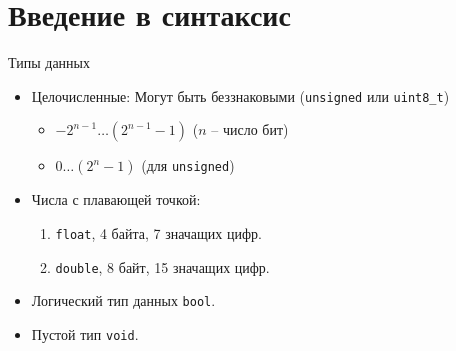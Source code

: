 \documentclass[9pt]{beamer}
\begin{document}
\section{Введение в синтаксис}
\begin{frame}{Типы данных}
    \begin{itemize}
        \item<1-> Целочисленные:
        Могут быть беззнаковыми (\texttt{unsigned} или \texttt{uint8_t})
        \begin{itemize}
            \item $ -2^{n-1} \ldots (2^{n-1}-1) $ ($n$ -- число бит)
            \item $ 0 \ldots (2^{n}-1) $ (для \texttt{unsigned})
        \end{itemize}
        \item Числа с плавающей точкой:
        \begin{enumerate}
            \item \texttt{float}, 4 байта, 7 значащих цифр.
            \item \texttt{double}, 8 байт, 15 значащих цифр.
        \end{enumerate}
        \item Логический тип данных \texttt{bool}.
        \item Пустой тип \texttt{void}.        
    \end{itemize}
\end{frame}
\end{document}
